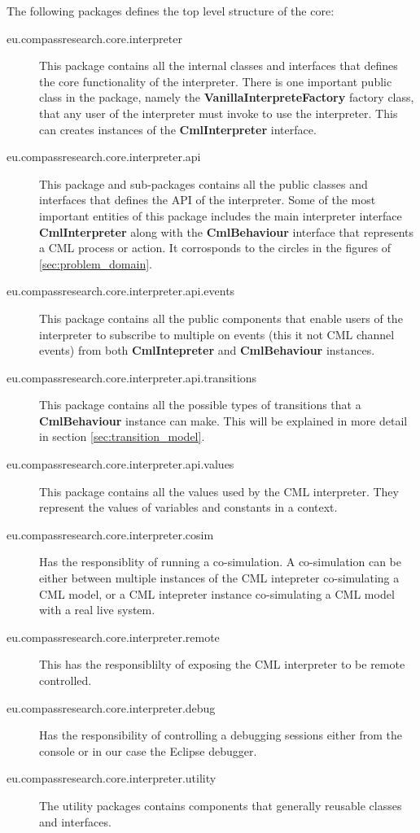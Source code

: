 \documentclass[a4paper, 10pt]{include/compassreport}   %
\begin{document}
The following packages defines the top level structure of the core:
\begin{description}

\item[eu.compassresearch.core.interpreter] This package contains all
  the internal classes and interfaces that defines the core
  functionality of the interpreter. There is one important public class
  in the package, namely the \textbf{VanillaInterpreteFactory} factory
  class, that any user of the interpreter must invoke to use the
  interpreter. This can creates instances of the \textbf{CmlInterpreter}
  interface.
  
\item[eu.compassresearch.core.interpreter.api] This package and
  sub-packages contains all the public classes and interfaces that
  defines the API of the interpreter. Some of the most important
  entities of this package includes the main interpreter interface
  \textbf{CmlInterpreter} along with the \textbf{CmlBehaviour} interface
  that represents a CML process or action. It corrosponds to the circles
  in the figures of \autoref{sec:problem_domain}.

\item[eu.compassresearch.core.interpreter.api.events] This package
  contains all the public components that enable users of the
  interpreter to subscribe to multiple on events (this it not CML
  channel events) from both \textbf{CmlIntepreter} and
  \textbf{CmlBehaviour} instances.

\item[eu.compassresearch.core.interpreter.api.transitions] This
  package contains all the possible types of transitions that a
  \textbf{CmlBehaviour} instance can make. This will be explained in
  more detail in section \ref{sec:transition_model}.

\item[eu.compassresearch.core.interpreter.api.values] This package
  contains all the values used by the CML interpreter. They represent
  the values of variables and constants in a context.

\item[eu.compassresearch.core.interpreter.cosim] Has the responsiblity
  of running a co-simulation. A co-simulation can be either between
  multiple instances of the CML intepreter co-simulating a CML model, or
  a CML intepreter instance co-simulating a CML model with a real live
  system.

\item[eu.compassresearch.core.interpreter.remote] This has the
  responsiblilty of exposing the CML interpreter to be remote
  controlled.

\item[eu.compassresearch.core.interpreter.debug] Has the
  responsibility of controlling a debugging sessions either from the console
  or in our case the Eclipse debugger.

\item[eu.compassresearch.core.interpreter.utility] The utility
  packages contains components that generally reusable classes and
  interfaces. 

\end{description}
\end{document}
